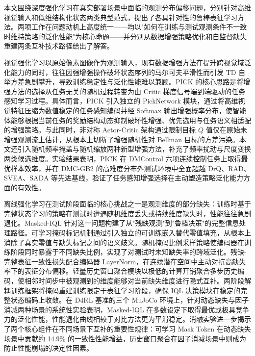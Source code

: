 


本文围绕深度强化学习在真实部署场景中面临的观测分布偏移问题，分别针对高维视觉输入和低维结构化状态两类典型范式，提出了各具针对性的鲁棒表征学习方法。两项工作在问题动机上高度统一——均以"如何在训练与测试观测条件不一致时维持策略的泛化性能"为核心命题——并分别从数据增强策略优化和自监督缺失重建两条互补技术路径给出了解答。


视觉强化学习以原始像素图像作为观测输入，现有数据增强方法在提升跨视觉域泛化能力的同时，往往因强增强操作破坏状态序列的马尔可夫平滑性而引发 TD 自举方差急剧攀升，导致训练稳定性与泛化性能难以兼顾。PICK 的核心思路是将增强方法的选择从任务无关的随机过程转变为由 Critic 梯度信号端到端驱动的任务感知学习过程。具体而言，PICK 引入独立的 PickNetwork 模块，通过将高维视觉特征压缩为数值稳定的任务感知编码并经 Softmax 输出增强概率分布，使智能体能够根据当前任务的奖励结构动态抑制破坏性增强、优先选用与任务语义相适配的增强策略。与此同时，非对称 Actor-Critic 架构通过限制目标 $Q$ 值仅在原始未增强观测流上估计，从根本上切断了增强随机性对 Bellman 目标的方差污染。本文还引入随机频率掩盖与随机缩放两种新型增强方法，补充了频率扰动与尺度变换两类候选维度。实验结果表明，PICK 在 DMControl 六项连续控制任务上取得最优样本效率，并在 DMC-GB2 的高难度分布外测试环境中全面超越 DrQ、RAD、SVEA、SADA 等先进基线，验证了任务感知增强选择在主动塑造策略泛化能力方面的有效性。


离线强化学习在测试阶段面临的核心挑战之一是观测维度的部分缺失：训练时基于完整状态学习的策略在测试时遭遇随机维度丢失或持续维度缺失时，性能往往急剧退化。Masked-IQL 针对这一问题构建了从"残缺观测"到"鲁棒决策"的完整信息处理路径。可学习掩码标记机制通过引入独立的可训练嵌入替代零值填充，从根本上消除了真实零值与缺失标记之间的语义歧义。随机掩码比例采样策略使编码器在训练阶段同时暴露于不同缺失比例，实现了对测试时未知缺失率的跨域泛化。残缺-完整表征一致性损失配合编码器 LayerNorm，在连续潜在空间中主动对抗高缺失率下的表征分布偏移。轻量历史窗口聚合模块以极低的计算开销聚合多步历史编码，使相邻时间步中被观测到的维度能够对当前缺失维度进行隐式互补。两阶段解耦训练框架将掩码重建训练限定于表征学习阶段，确保 IQL 决策模块在稳定的完整状态编码上收敛。在 D4RL 基准的三个 MuJoCo 环境上，针对动态缺失与因子消减两种场景的系统性实验表明，Masked-IQL 在多数设定下取得最优或极具竞争力的泛化性能，性能退化曲线相较于对比方法更为平滑稳定。消融实验进一步揭示了两个核心组件在不同场景下互补的重要性规律：可学习 Mask Token 在动态缺失场景中贡献约 14.9\% 的一致性性能增益，历史窗口聚合在因子消减场景中则成为防止性能崩塌的决定性因素。

